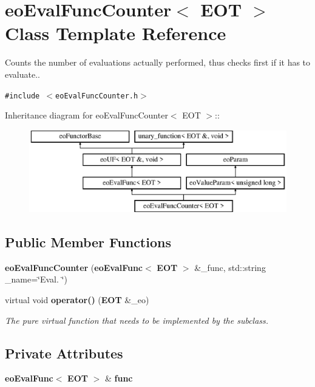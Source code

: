 \section{eo\-Eval\-Func\-Counter$<$ EOT $>$ Class Template Reference}
\label{classeo_eval_func_counter}
Counts the number of evaluations actually performed, thus checks first if it has to evaluate..  


{\tt \#include $<$eo\-Eval\-Func\-Counter.h$>$}

Inheritance diagram for eo\-Eval\-Func\-Counter$<$ EOT $>$::\begin{figure}[H]
\begin{center}
\leavevmode
\includegraphics[height=3.60709cm]{classeo_eval_func_counter}
\end{center}
\end{figure}
\subsection*{Public Member Functions}
\begin{CompactItemize}
\item 
{\bf eo\-Eval\-Func\-Counter} ({\bf eo\-Eval\-Func}$<$ {\bf EOT} $>$ \&\_\-func, std::string \_\-name=\char`\"{}Eval. \char`\"{})\label{classeo_eval_func_counter_a0}

\item 
virtual void {\bf operator()} ({\bf EOT} \&\_\-eo)\label{classeo_eval_func_counter_a1}

\begin{CompactList}\small\item\em The pure virtual function that needs to be implemented by the subclass. \item\end{CompactList}\end{CompactItemize}
\subsection*{Private Attributes}
\begin{CompactItemize}
\item 
{\bf eo\-Eval\-Func}$<$ {\bf EOT} $>$ \& {\bf func}\label{classeo_eval_func_counter_r0}

\end{CompactItemize}


